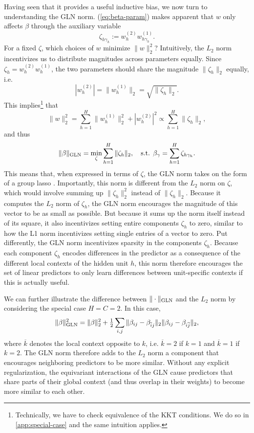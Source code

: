 \documentclass{article}
\theoremstyle{plain}
\theoremstyle{definition}
\theoremstyle{remark}
\begin{document}
Having seen that it provides a useful inductive bias, we now turn to understanding the GLN norm.
(\ref{eq:beta-param}) makes apparent that $w$ only affects $\beta$ through the auxiliary variable
\begin{equation}
    \zeta_{h\gamma_h}:=w^{(2)}_hw^{(1)}_{h\gamma_h}.
\end{equation}
For a fixed $\zeta$, which choices of $w$ minimize $\|w\|_2^2$?
Intuitively, the $L_2$ norm incentivizes us to distribute magnitudes across parameters equally.
Since $\zeta_h=w^{(2)}_hw^{(1)}_h$, the two parameters should share the magnitude $\|\zeta_h\|_2$ equally, i.e.
\begin{equation}
    |w^{(2)}_h|=\|w^{(1)}_h\|_2=\sqrt{\|\zeta_h\|_2}.
\end{equation}
This implies\footnote{Technically, we have to check equivalence of the KKT conditions. We do so in \cref{app:special-case} and the same intuition applies.} that
\begin{equation}
    \|w\|_2^2=\sum_{h=1}^H\|w^{(1)}_h\|_2^2+|w^{(2)}_h|^2\propto\sum_{h=1}^H\|\zeta_h\|_2,
\end{equation}
and thus
\begin{equation}
\label{eq:beta-gln}
    \|\beta\|_{\rm GLN}=\min_{\zeta}\sum_{h=1}^H\|\zeta_h\|_2,\quad
    \text{s.t. }\beta_{\gamma}=\sum_{h=1}^H\zeta_{h\gamma_h}.
\end{equation}
This means that, when expressed in terms of $\zeta$, the GLN norm takes on the form of a group lasso \citep{yuan_model_2006}.
Importantly, this norm is different from the $L_2$ norm on $\zeta$, which would involve summing up $\|\zeta_h\|_2^2$ instead of $\|\zeta_h\|_2$.
Because it computes the $L_2$ norm of $\zeta_h$, the GLN norm encourages the magnitude of this vector to be as small as possible.
But because it sums up the norm itself instead of its square, it also incentivizes setting entire components $\zeta_h$ to zero, similar to how the L1 norm incentivizes setting single entries of a vector to zero.
Put differently, the GLN norm incentivizes sparsity in the components $\zeta_h$.
Because each component $\zeta_h$ encodes differences in the predictor as a consequence of the different local contexts of the hidden unit $h$, this norm therefore encourages the set of linear predictors to only learn differences between unit-specific contexts if this is actually useful.

We can further illustrate the difference between $\|\cdot\|_{\rm GLN}$ and the $L_2$ norm by considering the special case $H=C=2$.
In this case,
\begin{equation}
\label{eq:beta-norm-2}
    \|\beta\|_{\rm GLN}^2=\|\beta\|_2^2+\tfrac12\sum_{i,j}\|\beta_{ij}-\beta_{\overline{i}j}\|_2\|\beta_{ij}-\beta_{i\overline{j}}\|_2,
\end{equation}
where $\overline{k}$ denotes the local context opposite to $k$, i.e. $\overline{k}=2$ if $k=1$ and $\overline{k}=1$ if $k=2$.  
The GLN norm therefore adds to the $L_2$ norm a component that encourages neighboring predictors to be more similar.
Without any explicit regularization, the equivariant interactions of the GLN cause predictors that share parts of their global context (and thus overlap in their weights) to become more similar to each other.
\end{document}
